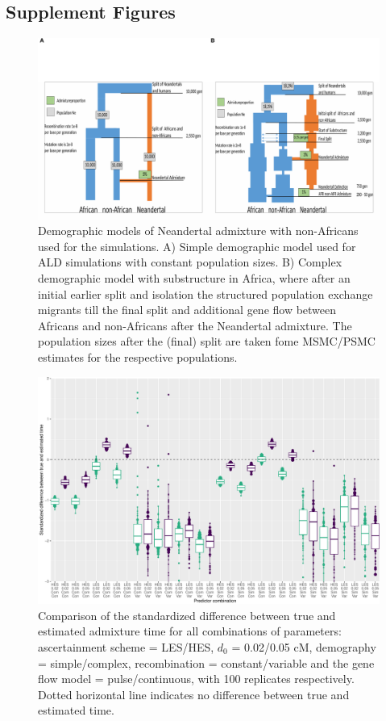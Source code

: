 \documentclass[]{article}
\begin{document}
\subsection{Supplement Figures }

\begin{figure}
\centering
\includegraphics{Admixture_Time_Inference_Paper_Draft_files/figure-latex/figS1-1.pdf}
\caption{\label{fig:figS1} Demographic models of Neandertal admixture with non-Africans used for the simulations. A) Simple demographic model used for ALD simulations with constant population sizes. B) Complex demographic model with substructure in Africa, where after an initial earlier split and isolation the structured population exchange migrants till the final split and additional gene flow between Africans and non-Africans after the Neandertal admixture. The  population sizes after the (final) split are taken fome MSMC/PSMC estimates for the respective populations.}
\end{figure}

\begin{figure}
\centering
\includegraphics{Admixture_Time_Inference_Paper_Draft_files/figure-latex/figS2-1.pdf}
\caption{\label{fig:figS2} Comparison of the standardized difference between true and estimated admixture time for all combinations of parameters: ascertainment scheme = LES/HES,  $d_{0}$ = 0.02/0.05 cM, demography = simple/complex, recombination = constant/variable and the gene flow model = pulse/continuous, with 100 replicates respectively. Dotted horizontal line indicates no difference between true and estimated time.}
\end{figure}
\end{document}
